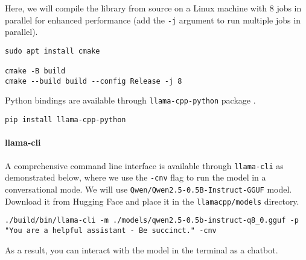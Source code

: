 Here, we will compile the library from source on a Linux machine with 8 jobs in parallel for enhanced performance (add the \texttt{-j} argument to run multiple jobs in parallel). 

\begin{verbatim}
sudo apt install cmake

cmake -B build
cmake --build build --config Release -j 8
\end{verbatim}

Python bindings are available through \texttt{llama-cpp-python} package .

\begin{verbatim}
pip install llama-cpp-python
\end{verbatim}

\paragraph{llama-cli}

A comprehensive command line interface is available through \texttt{llama-cli} as demonstrated below, where we use the \texttt{-cnv} flag to run the model in a conversational mode. We will use \texttt{Qwen/Qwen2.5-0.5B-Instruct-GGUF} model. Download it from Hugging Face and place it in the \texttt{llamacpp/models} directory.

\begin{verbatim}
./build/bin/llama-cli -m ./models/qwen2.5-0.5b-instruct-q8_0.gguf -p "You are a helpful assistant - Be succinct." -cnv
\end{verbatim}

As a result, you can interact with the model in the terminal as a chatbot.


